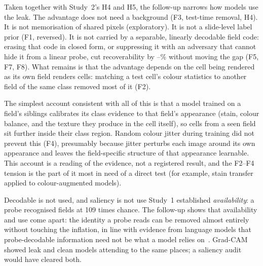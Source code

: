 

Taken together with Study~2's H4 and H5, the follow-up narrows how models use the leak. The advantage does not need a
background (F3, test-time removal, H4). It is not memorisation of shared pixels (exploratory). It is not a slide-level label
prior (F1, reversed). It is not carried by a separable, linearly decodable field code: erasing that code in closed form, or
suppressing it with an adversary that cannot hide it from a linear probe, cut recoverability by \RecoveryCutMin--\RecoveryCutMax\%
without moving the gap (F5, F7, F8). What remains is that the advantage depends on the cell being rendered as its own field
renders cells: matching a test cell's colour statistics to another field of the same class removed most of it (F2).

The simplest account consistent with all of this is that a model trained on a field's siblings calibrates its class
evidence to that field's appearance (stain, colour balance, and the texture they produce in the cell itself), so cells
from a seen field sit further inside their class region. Random colour jitter during training did not prevent this (F4),
presumably because jitter perturbs each image around its own appearance and leaves the field-specific structure of that
appearance learnable. This account is a reading of the evidence, not a registered result, and the F2--F4 tension is the
part of it most in need of a direct test (for example, stain transfer applied to colour-augmented models).

\begin{decisionbox}{Decodable is not used, and saliency is not use}
Study~1 established \emph{availability}: a probe recognised fields at 109 times chance. The follow-up shows that availability
and use come apart: the identity a probe reads can be removed almost entirely without touching the inflation, in line with
evidence from language models that probe-decodable information need not be what a model relies
on~\citep{elazar2021amnesic,ravichander2021probing}. Grad-CAM showed leak and clean models attending to the same places; a
saliency audit would have cleared both.
\end{decisionbox}

